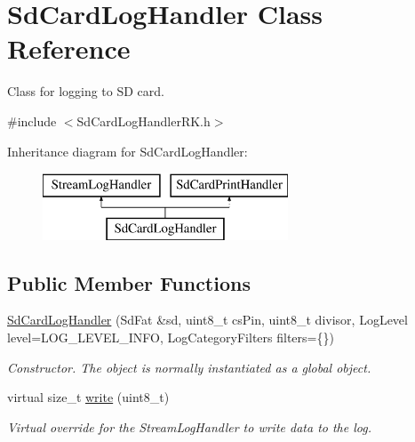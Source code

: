 \hypertarget{class_sd_card_log_handler}{}\section{Sd\+Card\+Log\+Handler Class Reference}
\label{class_sd_card_log_handler}


Class for logging to SD card.  




{\ttfamily \#include $<$Sd\+Card\+Log\+Handler\+R\+K.\+h$>$}

Inheritance diagram for Sd\+Card\+Log\+Handler\+:\begin{figure}[H]
\begin{center}
\leavevmode
\includegraphics[height=2.000000cm]{class_sd_card_log_handler}
\end{center}
\end{figure}
\subsection*{Public Member Functions}
\begin{DoxyCompactItemize}
\item 
\mbox{\hyperlink{class_sd_card_log_handler_a307fc19ae158016fa223b245210a050c}{Sd\+Card\+Log\+Handler}} (Sd\+Fat \&sd, uint8\+\_\+t cs\+Pin, uint8\+\_\+t divisor, Log\+Level level=L\+O\+G\+\_\+\+L\+E\+V\+E\+L\+\_\+\+I\+N\+FO, Log\+Category\+Filters filters=\{\})
\begin{DoxyCompactList}\small\item\em Constructor. The object is normally instantiated as a global object. \end{DoxyCompactList}\item 
\mbox{\label{class_sd_card_log_handler_aaf48dcdc1f7b0965e66cbc976f4e12e0}} 
virtual size\+\_\+t \mbox{\hyperlink{class_sd_card_log_handler_aaf48dcdc1f7b0965e66cbc976f4e12e0}{write}} (uint8\+\_\+t)
\begin{DoxyCompactList}\small\item\em Virtual override for the Stream\+Log\+Handler to write data to the log. \end{DoxyCompactList}\end{DoxyCompactItemize}


